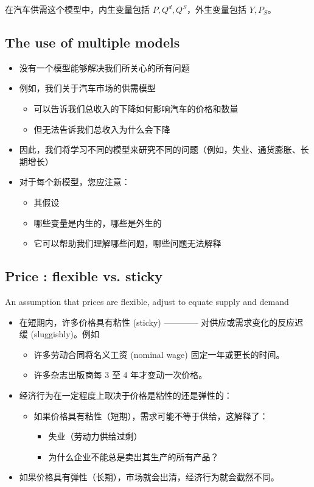 在汽车供需这个模型中，内生变量包括 $P, Q^d, Q^S$，外生变量包括 $Y, P_S$。

\subsection{The use of multiple models}

\begin{itemize}
    \item 没有一个模型能够解决我们所关心的所有问题
    \item 例如，我们关于汽车市场的供需模型
    \begin{itemize}
        \item 可以告诉我们总收入的下降如何影响汽车的价格和数量
        \item 但无法告诉我们总收入为什么会下降
    \end{itemize}
    \item 因此，我们将学习不同的模型来研究不同的问题（例如，失业、通货膨胀、长期增长）
    \item 对于每个新模型，您应注意：
    \begin{itemize}
        \item 其假设
        \item 哪些变量是内生的，哪些是外生的
        \item 它可以帮助我们理解哪些问题，哪些问题无法解释
    \end{itemize}
\end{itemize}

\subsection{Price : flexible vs. sticky}

\begin{definition}
    An assumption that prices are flexible, adjust to equate supply and demand
\end{definition}
\begin{itemize}
    \item 在短期内，许多价格具有粘性 (sticky) ———— 对供应或需求变化的反应迟缓 (sluggishly)。例如
    \begin{itemize}
        \item 许多劳动合同将名义工资 (nominal wage) 固定一年或更长的时间。
        \item 许多杂志出版商每 3 至 4 年才变动一次价格。
    \end{itemize}
    \item 经济行为在一定程度上取决于价格是粘性的还是弹性的： 
    \begin{itemize}
        \item 如果价格具有粘性（短期），需求可能不等于供给，这解释了：
        \begin{itemize}
            \item 失业（劳动力供给过剩）
            \item 为什么企业不能总是卖出其生产的所有产品？
        \end{itemize}
    \end{itemize}
    \item 如果价格具有弹性（长期），市场就会出清，经济行为就会截然不同。
\end{itemize}

% 
